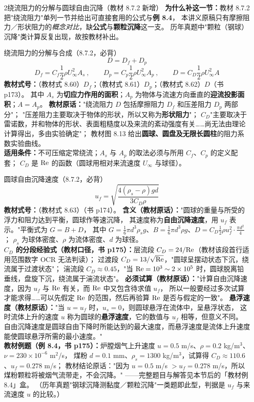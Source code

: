 \begin{kaodian}{2}{绕流阻力的分解与圆球自由沉降（教材 8.7.2 新增）}
\textbf{为什么补这一节：}教材 8.7.2 把"绕流阻力"单列一节并给出可直接套用的公式与\textbf{例 8.4}，
本讲义原稿只有摩擦阻力／形状阻力的\emph{概念对比}，缺\textbf{公式}与\textbf{颗粒沉降}这一支。
历年真题中"颗粒（钢球）沉降"类计算反复出现，故按教材补出。

\begin{gongshi}{绕流阻力的分解与合成（8.7.2，必背）}
\[ D=D_f+D_p \]
\[ D_f=C_f\frac{1}{2}\rho U_\infty^2A_s\ ,\qquad
   D_p=C_p\frac{1}{2}\rho U_\infty^2A_p\ ,\qquad
   D=C_D\frac{1}{2}\rho U_\infty^2A \]
\textbf{教材式号：}（教材式 8.60）$D_f$；（教材式 8.61）$D_p$；（教材式 8.62）$D$（书 p173）。
其中 $A_s$ 为\textbf{切应力作用的面积}；$A_p$ 为物体与流速方向垂直的\textbf{迎流投影面积}；$A=A_p$。
\textbf{教材原话：}"绕流阻力 $D$ 包括摩擦阻力 $D_f$ 和压差阻力 $D_p$ 两部分"；
"压差阻力主要取决于物体的形状，所以又称为\textbf{形状阻力}"；
$C_D$"主要取决于雷诺数，并和物体的形状、表面粗糙度以及来流的紊动强度有关……尚无法由理论计算得出，多由实验确定"；
教材图 8.13 给出\textbf{圆球、圆盘及无限长圆柱}的阻力系数实验曲线。\\
\textbf{适用条件：}不可压缩定常绕流；$A_s$ 与 $A_p$ 的取法必须与所用 $C_f$、$C_p$ 的定义配套；
$C_D$ 是 $\mathrm{Re}$ 的函数（圆球用相对来流速度 $U_\infty$ 与球径）。
\end{gongshi}

\begin{gongshi}{圆球自由沉降速度（8.7.2，必背）}
\[ u_f=\sqrt{\frac{4(\rho_s-\rho)gd}{3C_D\rho}} \]
\textbf{教材式号：}（教材式 8.63）（书 p174）。
\textbf{含义（教材原话）：}"圆球的重量与所受的浮力和阻力达到平衡，圆球作等速沉降，
其速度称为\textbf{自由沉降速度}，用 $u_f$ 表示。"平衡式为 $G=B+D$，
其中 $G=\frac16\pi d^3\rho_s g$、$B=\frac16\pi d^3\rho g$、$D=C_D\frac12\rho u_f^2\cdot\frac{\pi d^2}{4}$；
$\rho_s$ 为球体密度、$\rho$ 为流体密度、$d$ 为球径。\\
\textbf{$C_D$ 的分段经验式（教材口径，书 p175）：}层流段 $C_D=24/\mathrm{Re}$（教材该段首行适用范围数字 OCR 无法判读）；
过渡段 $C_D=13/\sqrt{\mathrm{Re}}$，"圆球呈摆动状态下沉，绕流属于过渡状态"；
湍流段 $C_D\approx0.45$，"当 $\mathrm{Re}=10^3\sim2\times10^5$ 时，圆球脱离铅垂线，盘旋下沉，绕流属于湍流状态"。
\textbf{必须试算（教材原话）：}"计算自由沉降速度，因为 $u_f$ 与 $\mathrm{Re}$ 有关，而 $\mathrm{Re}$ 中又包含待求值 $u_f$，
所以一般要经过多次试算才能求得……可以先假定 $\mathrm{Re}$ 的范围，然后再验算 $\mathrm{Re}$ 是否与假定的一致"。
\textbf{悬浮速度（教材原话）：}"当 $u=u_f$ 时，$u_s=0$，则圆球悬浮在流体中，呈悬浮状态，
这时流体上升的速度 $u$ 称为圆球的\textbf{悬浮速度}，它的数值与 $u_f$ 相等，但意义不同。
自由沉降速度是圆球自由下降时所能达到的最大速度，而悬浮速度是流体上升速度能使圆球悬浮所需的最小速度。"\\
\textbf{教材例题（例 8.4，书 p175）：}炉膛烟气上升速度 $u=0.5$ m/s、$\rho=0.2$ kg/m$^3$、$\nu=230\times10^{-6}$ m$^2$/s，
煤粉 $d=0.1$ mm、$\rho_s=1300$ kg/m$^3$，试算得 $C_D\approx110.6$、$u_f=0.278$ m/s；
教材结论原话："因为 $u=0.5$ m/s $>u_f=0.278$ m/s，所以煤粉颗粒将被烟气流带走，不会沉降。"
——完整题目与解答见本节后的「教材例 8.4」盒。
（历年真题"钢球沉降测黏度／颗粒沉降"一类题即此型，判据是 $u_f$ 与来流速度 $u$ 的比较。）
\end{gongshi}


\end{kaodian}
